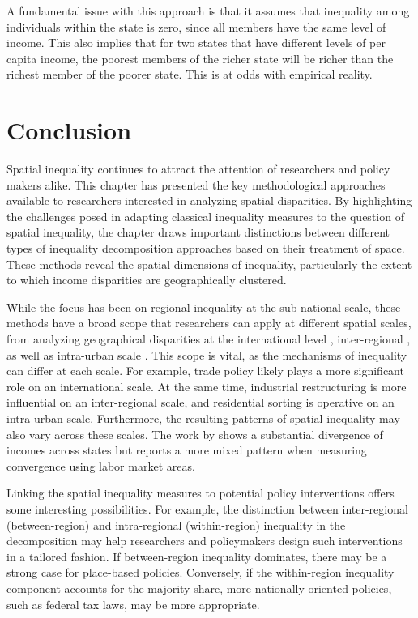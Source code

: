 \documentclass[
  a4paper, 
  twoside,
  final
]{article}
\begin{document}
A fundamental issue with this approach is that it assumes that
inequality among individuals within the state is zero, since all members
have the same level of income. This also implies that for two states
that have different levels of per capita income, the poorest members of
the richer state will be richer than the richest member of the poorer
state. This is at odds with empirical reality.

\section{Conclusion}\label{conclusion}

Spatial inequality continues to attract the attention of researchers and
policy makers alike. This chapter has presented the key methodological
approaches available to researchers interested in analyzing spatial
disparities. By highlighting the challenges posed in adapting classical
inequality measures to the question of spatial inequality, the chapter
draws important distinctions between different types of inequality
decomposition approaches based on their treatment of space. These
methods reveal the spatial dimensions of inequality, particularly the
extent to which income disparities are geographically clustered.

While the focus has been on regional inequality at the sub-national
scale, these methods have a broad scope that researchers can apply at
different spatial scales, from analyzing geographical disparities at the
international level \citep{redding2004EconomicGeography}, inter-regional
\citep{bathelt2024NatureCauses}, as well as intra-urban scale
\citep{oecd2018DividedCities}. This scope is vital, as the mechanisms of
inequality can differ at each scale. For example, trade policy likely
plays a more significant role on an international scale. At the same
time, industrial restructuring is more influential on an inter-regional
scale, and residential sorting is operative on an intra-urban scale.
Furthermore, the resulting patterns of spatial inequality may also vary
across these scales. The work by \citet{ganong2017WhyHas} shows a
substantial divergence of incomes across states but reports a more mixed
pattern when measuring convergence using labor market areas.

Linking the spatial inequality measures to potential policy
interventions offers some interesting possibilities. For example, the
distinction between inter-regional (between-region) and intra-regional
(within-region) inequality in the decomposition may help researchers and
policymakers design such interventions in a tailored fashion. If
between-region inequality dominates, there may be a strong case for
place-based policies. Conversely, if the within-region inequality
component accounts for the majority share, more nationally oriented
policies, such as federal tax laws, may be more appropriate.
\end{document}
